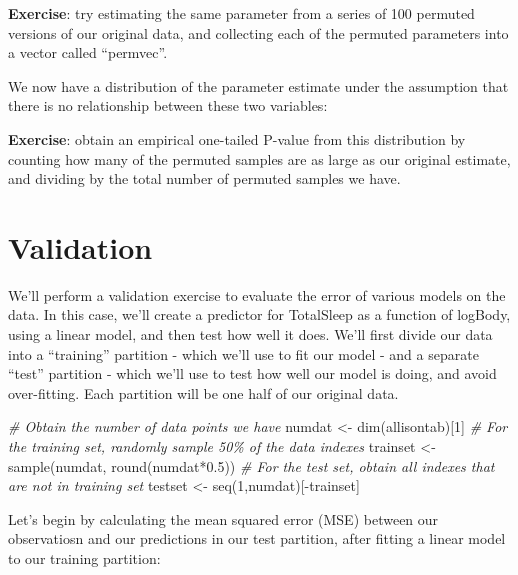 \documentclass[
]{book}
\newenvironment{Shaded}{\begin{snugshade}}{\end{snugshade}}
\newcommand{\CommentTok}[1]{\textcolor[rgb]{0.56,0.35,0.01}{\textit{#1}}}
\newcommand{\DecValTok}[1]{\textcolor[rgb]{0.00,0.00,0.81}{#1}}
\newcommand{\FloatTok}[1]{\textcolor[rgb]{0.00,0.00,0.81}{#1}}
\newcommand{\FunctionTok}[1]{\textcolor[rgb]{0.00,0.00,0.00}{#1}}
\newcommand{\NormalTok}[1]{#1}
\newcommand{\OtherTok}[1]{\textcolor[rgb]{0.56,0.35,0.01}{#1}}
\newcommand{\SpecialCharTok}[1]{\textcolor[rgb]{0.00,0.00,0.00}{#1}}
\begin{document}
\textbf{Exercise}: try estimating the same parameter from a series of 100 permuted versions of our original data, and collecting each of the permuted parameters into a vector called ``permvec''.

We now have a distribution of the parameter estimate under the assumption that there is no relationship between these two variables:

\textbf{Exercise}: obtain an empirical one-tailed P-value from this distribution by counting how many of the permuted samples are as large as our original estimate, and dividing by the total number of permuted samples we have.

\hypertarget{validation}{%
\section{Validation}\label{validation}}

We'll perform a validation exercise to evaluate the error of various models on the data. In this case, we'll create a predictor for TotalSleep as a function of logBody, using a linear model, and then test how well it does. We'll first divide our data into a ``training'' partition - which we'll use to fit our model - and a separate ``test'' partition - which we'll use to test how well our model is doing, and avoid over-fitting. Each partition will be one half of our original data.

\begin{Shaded}
\begin{Highlighting}[]
\CommentTok{\# Obtain the number of data points we have}
\NormalTok{numdat }\OtherTok{\textless{}{-}} \FunctionTok{dim}\NormalTok{(allisontab)[}\DecValTok{1}\NormalTok{]}
\CommentTok{\# For the training set, randomly sample 50\% of the data indexes}
\NormalTok{trainset }\OtherTok{\textless{}{-}} \FunctionTok{sample}\NormalTok{(numdat, }\FunctionTok{round}\NormalTok{(numdat}\SpecialCharTok{*}\FloatTok{0.5}\NormalTok{))}
\CommentTok{\# For the test set, obtain all indexes that are not in training set}
\NormalTok{testset }\OtherTok{\textless{}{-}} \FunctionTok{seq}\NormalTok{(}\DecValTok{1}\NormalTok{,numdat)[}\SpecialCharTok{{-}}\NormalTok{trainset]}
\end{Highlighting}
\end{Shaded}

Let's begin by calculating the mean squared error (MSE) between our observatiosn and our predictions in our test partition, after fitting a linear model to our training partition:
\end{document}
